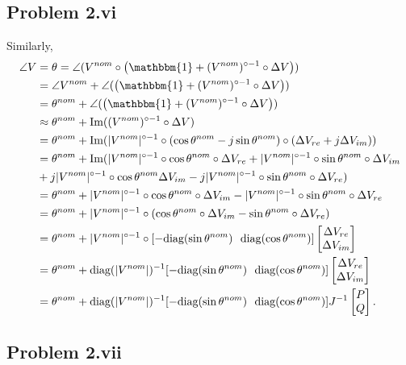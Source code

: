 \subsection*{Problem 2.vi}
Similarly,
\begin{align*}
	\angle V &= \theta = \angle (V^{nom} \circ \left(\mathbbm{1} + (V^{nom})^{\circ -1}\circ \Delta V\right))\\
	&= \angle V^{nom} + \angle(\left(\mathbbm{1} + (V^{nom})^{\circ -1}\circ \Delta V\right))\\
	&= \theta^{nom} + \angle(\left(\mathbbm{1} + (V^{nom})^{\circ -1}\circ \Delta V\right))\\
	&\approx \theta^{nom} + \text{Im}((V^{nom})^{\circ -1}\circ \Delta V)\\
	&= \theta^{nom} + \text{Im}(|V^{nom}|^{\circ-1} \circ (\cos \theta^{nom}-j\sin\theta^{nom})\circ (\Delta V_{re} + j \Delta V_{im}))\\
	&= \theta^{nom} + \text{Im}(|V^{nom}|^{\circ-1} \circ \cos\theta^{nom} \circ \Delta V_{re} + |V^{nom}|^{\circ-1} \circ \sin\theta^{nom}\circ \Delta V_{im}\\
	&+ j |V^{nom}|^{\circ-1} \circ \cos\theta^{nom}\Delta V_{im}-j|V^{nom}|^{\circ-1} \circ \sin\theta^{nom}\circ \Delta V_{re})\\
	&= \theta^{nom} + |V^{nom}|^{\circ-1} \circ \cos\theta^{nom}\circ\Delta V_{im}-|V^{nom}|^{\circ-1} \circ \sin\theta^{nom}\circ \Delta V_{re}\\
	&= \theta^{nom}+ |V^{nom}|^{\circ-1} \circ (\cos\theta^{nom}\circ\Delta V_{im} - \sin\theta^{nom}\circ \Delta V_{re})\\
	&= \theta^{nom} + |V^{nom}|^{\circ-1} \circ [-\text{diag}(\sin\theta^{nom})\ \ \text{diag}(\cos\theta^{nom})] \begin{bmatrix}
		\Delta V_{re}\\\Delta V_{im}
	\end{bmatrix}\\
	&= \theta^{nom} + \text{diag}(|V^{nom}|)^{-1}[-\text{diag}(\sin\theta^{nom})\ \ \text{diag}(\cos\theta^{nom})] \begin{bmatrix}
	\Delta V_{re}\\\Delta V_{im}
	\end{bmatrix}\\
	&= \theta^{nom} + \text{diag}(|V^{nom}|)^{-1}[-\text{diag}(\sin\theta^{nom})\ \ \text{diag}(\cos\theta^{nom})]J^{-1}\begin{bmatrix}
	P\\Q
	\end{bmatrix}.
\end{align*}
\subsection*{Problem 2.vii}